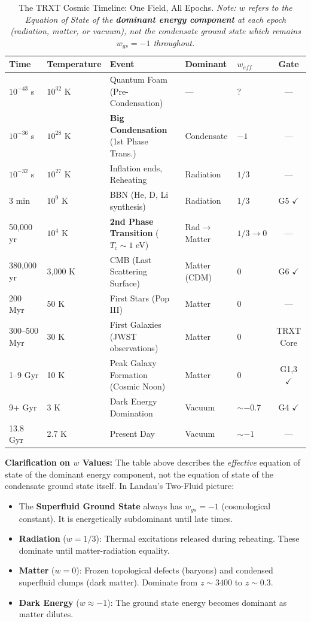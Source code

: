 \documentclass[a4paper,12pt]{article}
\begin{document}
\begin{table}[H]
\centering
\caption{The TRXT Cosmic Timeline: One Field, All Epochs. \textit{Note: $w$ refers to the Equation of State of the \textbf{dominant energy component} at each epoch (radiation, matter, or vacuum), not the condensate ground state which remains $w_{gs} = -1$ throughout.}}
\label{tab:timeline}
\footnotesize
\setlength{\tabcolsep}{3.5pt}
\begin{tabular}{@{}lllllc@{}}
\toprule
\textbf{Time} & \textbf{Temperature} & \textbf{Event} & \textbf{Dominant} & \textbf{$w_{eff}$} & \textbf{Gate} \\
\midrule
$10^{-43}$ s & $10^{32}$ K & Quantum Foam (Pre-Condensation) & --- & ? & --- \\
$10^{-36}$ s & $10^{28}$ K & \textbf{Big Condensation} (1st Phase Trans.) & Condensate & $-1$ & --- \\
$10^{-32}$ s & $10^{27}$ K & Inflation ends, Reheating & Radiation & $1/3$ & --- \\
3 min & $10^{9}$ K & BBN (He, D, Li synthesis) & Radiation & $1/3$ & G5 $\checkmark$ \\
50,000 yr & $10^{4}$ K & \textbf{2nd Phase Transition} ($T_c \sim 1$ eV) & Rad$\to$Matter & $1/3 \to 0$ & --- \\
380,000 yr & 3,000 K & CMB (Last Scattering Surface) & Matter (CDM) & 0 & G6 $\checkmark$ \\
200 Myr & 50 K & First Stars (Pop III) & Matter & 0 & --- \\
300--500 Myr & 30 K & First Galaxies (JWST observations) & Matter & 0 & TRXT Core \\
1--9 Gyr & 10 K & Peak Galaxy Formation (Cosmic Noon) & Matter & 0 & G1,3 $\checkmark$ \\
9+ Gyr & 3 K & Dark Energy Domination & Vacuum & $\sim -0.7$ & G4 $\checkmark$ \\
13.8 Gyr & 2.7 K & Present Day & Vacuum & $\sim -1$ & --- \\
\bottomrule
\end{tabular}
\end{table}

\textbf{Clarification on $w$ Values:}
The table above describes the \textit{effective} equation of state of the dominant energy component, not the equation of state of the condensate ground state itself. In Landau's Two-Fluid picture:
\begin{itemize}
    \item The \textbf{Superfluid Ground State} always has $w_{gs} = -1$ (cosmological constant). It is energetically subdominant until late times.
    \item \textbf{Radiation} ($w = 1/3$): Thermal excitations released during reheating. These dominate until matter-radiation equality.
    \item \textbf{Matter} ($w = 0$): Frozen topological defects (baryons) and condensed superfluid clumps (dark matter). Dominate from $z \sim 3400$ to $z \sim 0.3$.
    \item \textbf{Dark Energy} ($w \approx -1$): The ground state energy becomes dominant as matter dilutes.
\end{itemize}
\end{document}
